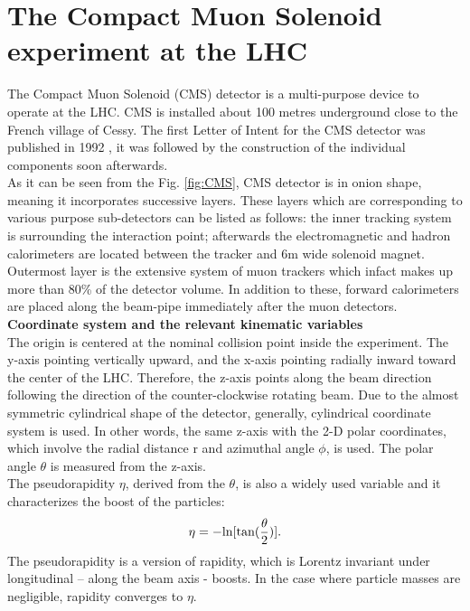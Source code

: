 \section{The Compact Muon Solenoid experiment at the LHC}
\label{sec:cms_ex}
The Compact Muon Solenoid (CMS) \cite{CMS_TDR} detector is a multi-purpose device to operate at the LHC. CMS is installed about 100 metres underground close to the French village of Cessy.
The first Letter of Intent for the CMS detector was published in 1992 \cite{CMS_FirstLet}, it was followed by the construction of the individual components soon afterwards. \\
As it can be seen from the Fig. \ref{fig:CMS}, CMS detector is in onion shape, meaning it incorporates successive layers. These layers which are corresponding to various purpose sub-detectors can be listed as follows: the inner tracking system is surrounding the interaction point; afterwards the electromagnetic and hadron calorimeters are located between the tracker and 6m wide solenoid magnet. Outermost layer is the extensive system of muon trackers which infact makes up more than 80\% of the detector volume. In addition to these, forward calorimeters are placed along the beam-pipe immediately after the muon detectors.\\
\textbf{Coordinate system and the relevant kinematic variables}\\
The origin is centered at the nominal collision point inside the experiment. The y-axis pointing vertically upward, and the x-axis pointing radially inward toward the center of the LHC. Therefore, the z-axis points along the beam direction following the direction of the counter-clockwise rotating beam. Due to the almost symmetric cylindrical shape of the detector, generally, cylindrical coordinate system is used. 
In other words, the same z-axis with the 2-D polar coordinates, which involve the radial distance r and azimuthal angle $\phi$, is used. The polar angle $\theta$ is measured from the z-axis.\\
The pseudorapidity $\eta$, derived from the $\theta$, is also a widely used variable and it characterizes the boost of the particles:
\begin{equation}
  \label{eqn:Eta}
   \eta = {\rm -ln [tan(\frac{\theta}{2})]}.
\end{equation}
The pseudorapidity is a version of rapidity, which is Lorentz invariant under longitudinal – along the beam axis - boosts. In the case where particle masses are negligible, rapidity converges to $\eta$.\\
